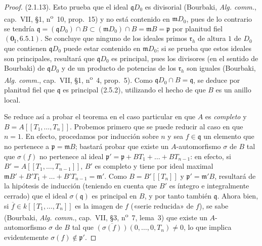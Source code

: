 \begin{proof}
(2.1.13). Esto prueba que el ideal $\mathfrak qD_0$ es divisorial (Bourbaki,
\emph{Alg. comm.}, cap.~VII, \S1, n\textsuperscript{o}~10, prop.~15) y no está contenido
en $\mathfrak mD_0$, pues de lo contrario se tendría
$\mathfrak q=(\mathfrak qD_0)\cap B\subset(\mathfrak mD_0)\cap B=\mathfrak mB=\mathfrak p$
por planitud fiel $(\mathbf 0_{\mathrm I}, 6.5.1)$. Se concluye que ninguno de los
ideales primos $\mathfrak r_h$ de altura $1$ de $D_0$ que contienen
$\mathfrak qD_0$ puede estar contenido en $\mathfrak mD_0$; si se prueba que estos
ideales son principales, resultará que $\mathfrak qD_0$ es principal, pues los
divisores (en el sentido de Bourbaki) de $\mathfrak qD_0$ y de un producto de potencias de los
$\mathfrak r_h$ son iguales (Bourbaki, \emph{Alg. comm.}, cap.~VII, \S1,
n\textsuperscript{o}~4, prop.~5). Como $\mathfrak qD_0\cap B=\mathfrak q$, se
deduce por planitud fiel que $\mathfrak q$ es principal (2.5.2), utilizando el
hecho de que $B$ es un anillo local.

Se reduce así a probar el teorema en el caso particular en que $A$ es
\emph{completo} y $B=A[[T_1,\ldots,T_n]]$. Probemos primero que se puede reducir al
caso en que $n=1$. En efecto, procedamos por inducción sobre $n$ y sea
$f\in\mathfrak q$ un elemento que no pertenece a $\mathfrak p=\mathfrak mB$; bastará
probar que existe un $A$-automorfismo $\sigma$ de $B$ tal que
$\sigma(f)$ no pertenece al ideal
$\mathfrak p'=\mathfrak p+BT_1+\ldots+BT_{n-1}$:
en efecto, si $B'=A[[T_1,\ldots,T_{n-1}]]$, $B'$ es completo y tiene por ideal maximal
$\mathfrak mB'+B'T_1+\ldots+B'T_{n-1}=\mathfrak m'$. Como
$B=B'[[T_n]]$ y $\mathfrak p'=\mathfrak m'B$, resultará de la hipótesis de
inducción (teniendo en cuenta que $B'$ es íntegro e integralmente cerrado) que el ideal
$\sigma(\mathfrak q)$ es principal en $B$, y por tanto también $\mathfrak q$. Ahora bien, si
$\overline f\in k[[T_1,\ldots,T_n]]$ es la imagen de $f$ («serie reducida» de $f$),
se sabe (Bourbaki, \emph{Alg. comm.}, cap.~VII, \S3, n\textsuperscript{o}~7,
lema~3) que existe un $A$-automorfismo $\sigma$ de $B$ tal que
$\overline{(\sigma(f))}(0,\ldots,0,T_n)\neq0$, lo que implica evidentemente
$\sigma(f)\notin\mathfrak p'$.


\end{proof}
